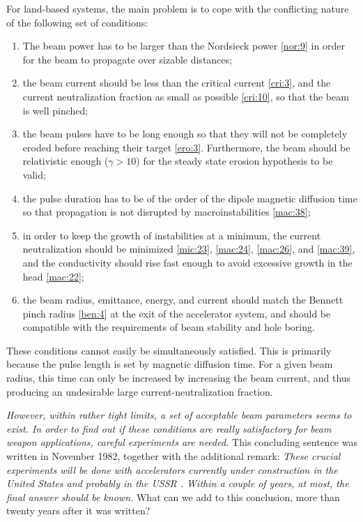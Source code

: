 \documentclass [12pt,a4paper,     ]{report} %
\begin{document}
	For land-based systems, the main problem is to cope with the conflicting nature of the following set of conditions:

\begin{enumerate}

\item The beam power has to be larger than the Nordsieck power \eqref{nor:9} in order for the beam to propagate over sizable distances;

\item the beam current should be less than the critical current \eqref{cri:3},  and the current neutralization fraction as small as possible \eqref{cri:10}, so that the beam is well pinched;

\item the beam pulses have to be long enough so that they will not be completely eroded before reaching their target \eqref{ero:3}.  Furthermore, the beam should be relativistic enough ($\gamma > 10$) for the steady state erosion hypothesis to be valid;

\item the pulse duration has to be of the order of the dipole magnetic diffusion time so that propagation is not disrupted by macroinstabilities \eqref{mac:38};

\item in order to keep the growth of instabilities at a minimum, the current neutralization should be minimized \eqref{mic:23}, \eqref{mac:24}, \eqref{mac:26}, and \eqref{mac:39}, and the conductivity  should rise fast enough to avoid excessive growth in the head \eqref{mac:22};

\item the beam radius, emittance, energy, and current should match the Bennett pinch radius \eqref{ben:4} at the exit of the accelerator system, and should be compatible with the requirements of beam stability and hole boring.

\end{enumerate}

	These conditions cannot easily be simultaneously satisfied.  This is primarily because the pulse length is set by magnetic diffusion time.  For a given beam radius, this time can only be increased by increasing the beam current, and thus producing an undesirable large current-neutralization fraction.

	\emph{However, within rather tight limits, a set of acceptable beam parameters seems to exist.  In order to find out if these conditions are really satisfactory for beam weapon applications, careful experiments are needed.} This concluding sentence was written in November 1982, together with the additional remark:  \emph{These crucial experiments will be done with accelerators currently under construction in the United States \cite{MOIR-1981-,BARLE1981A} and probably in the USSR \cite{PAVLO1980-}.  Within a couple of years, at most, the final answer should be known.}  What can we add to this conclusion, more than twenty years after it was written? 
\end{document}
